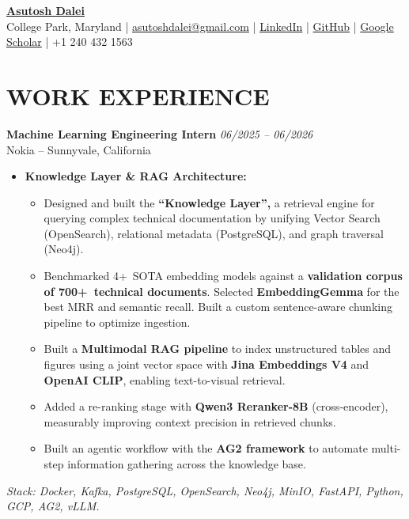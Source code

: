 \documentclass[9pt]{article}
\newcommand{\namesize}{\fontsize{20}{22}\selectfont}
\newcommand{\headersize}{\fontsize{10}{12}\selectfont}
\begin{document}
\pagestyle{empty}

\begin{center}
    {\bfseries \color{black} \namesize
    \href{https://asutoshdalei.github.io/AsutoshDalei/}{Asutosh Dalei}}\\[6pt]
    {\headersize
    College Park, Maryland |
    \href{mailto:asutoshdalei@gmail.com}{asutoshdalei@gmail.com} |
    \href{https://www.linkedin.com/in/asutosh-dalei2212}{LinkedIn} |
    \href{https://github.com/AsutoshDalei}{GitHub} |
    \href{https://scholar.google.com/citations?user=ZTEw6iQAAAAJ&hl=en&oi=sra}{Google Scholar} |
    +1 240 432 1563}
\end{center}
\vspace{-7pt}

\section*{WORK EXPERIENCE}

\textbf{Machine Learning Engineering Intern} \hfill \textit{06/2025 -- 06/2026}\\
Nokia -- Sunnyvale, California
\begin{itemize}
    \item \textbf{Knowledge Layer \& RAG Architecture:}
    \begin{itemize}
        \item Designed and built the \textbf{``Knowledge Layer'',} a retrieval engine for querying complex technical documentation by unifying Vector Search (OpenSearch), relational metadata (PostgreSQL), and graph traversal (Neo4j).
        \item Benchmarked 4+~SOTA embedding models against a \textbf{validation corpus of 700+~technical documents}. Selected \textbf{EmbeddingGemma} for the best MRR and semantic recall. Built a custom sentence-aware chunking pipeline to optimize ingestion.
        \item Built a \textbf{Multimodal RAG pipeline} to index unstructured tables and figures using a joint vector space with \textbf{Jina Embeddings V4} and \textbf{OpenAI CLIP}, enabling text-to-visual retrieval.
        \item Added a re-ranking stage with \textbf{Qwen3 Reranker-8B} (cross-encoder), measurably improving context precision in retrieved chunks.
        \item Built an agentic workflow with the \textbf{AG2 framework} to automate multi-step information gathering across the knowledge base.
    \end{itemize}
\end{itemize}
\textit{Stack: Docker, Kafka, PostgreSQL, OpenSearch, Neo4j, MinIO, FastAPI, Python, GCP, AG2, vLLM.}
\end{document}
